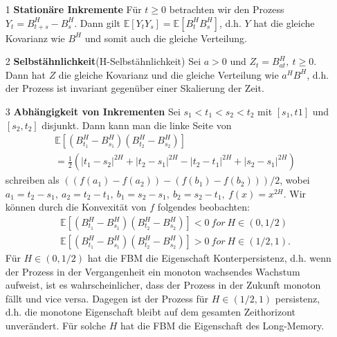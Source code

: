 \documentclass[12pt,titlepage,headsepline]{article}
\begin{document}
      \begin{itemize}
        \item [1] \textbf{Stationäre Inkremente} Für $t \geq 0$ betrachten wir den Prozess $Y_t = B_{t+s}^H - B_s^H$. Dann gilt $\mathbb{E}[Y_tY_s] = \mathbb{E}[B_t^HB_s^H]$, d.h. $Y$ hat die gleiche Kovarianz wie $B^H$ und somit auch die gleiche Verteilung.
        \item [2] \textbf{Selbstähnlichkeit}(H-Selbstähnlichkeit) Sei $a > 0 $ und $Z_t = B_{at}^H, \ t\geq 0$. Dann hat $Z$ die gleiche Kovarianz und die gleiche Verteilung wie $a^HB^H$, d.h. der Prozess ist invariant gegenüber einer Skalierung der Zeit.
        \item [3] \textbf{Abhängigkeit von Inkrementen} Sei $s_1 < t_1 < s_2 < t_2 $ mit $[s_1,t1]$ und $[s_2,t_2]$ disjunkt. Dann kann man die linke Seite von
        \begin{align*}
          & \mathbb{E}[(B_{t_1}^H - B_{s_1}^H)(B_{t_2}^H-B_{s_2}^H)] \\
          & =\frac{1}{2}(\lvert t_1-s_2 \rvert^{2H} + \lvert t_2-s_1 \rvert^{2H} - \lvert t_2-t_1 \rvert^{2H} + \lvert s_2-s_1 \rvert^{2H})
        \end{align*}
        schreiben als $((f(a_1)-f(a_2))-(f(b_1)-f(b_2))) / 2$, wobei $a_1 = t_2-s_1, \ a_2 = t_2 - t_1, \ b_1 = s_2 - s_1, \ b_2 = s_2 - t_1, \ f(x)=x^{2H}$. Wir können durch die Konvexität von $f$ folgendes beobachten:
        \begin{align*}
          & \mathbb{E}[(B_{t_1}^H - B_{s_1}^H)(B_{t_2}^H-B_{s_2}^H)] < 0 \ for \ H \in (0,1/2) \\
          & \mathbb{E}[(B_{t_1}^H - B_{s_1}^H)(B_{t_2}^H-B_{s_2}^H)] > 0 \ for \ H \in (1/2,1).
        \end{align*}
        Für $H \in (0,1/2)$ hat die FBM die Eigenschaft Konterpersistenz, d.h. wenn der Prozess in der Vergangenheit ein monoton wachsendes Wachstum aufweist, ist es wahrscheinlicher, dass der Prozess in der Zukunft monoton fällt und vice versa. Dagegen ist der Prozess für $H \in (1/2,1)$ persistenz, d.h. die monotone Eigenschaft bleibt auf dem gesamten Zeithorizont unverändert. Für solche $H$ hat die FBM die Eigenschaft des Long-Memory.
      \end{itemize}
\end{document}
